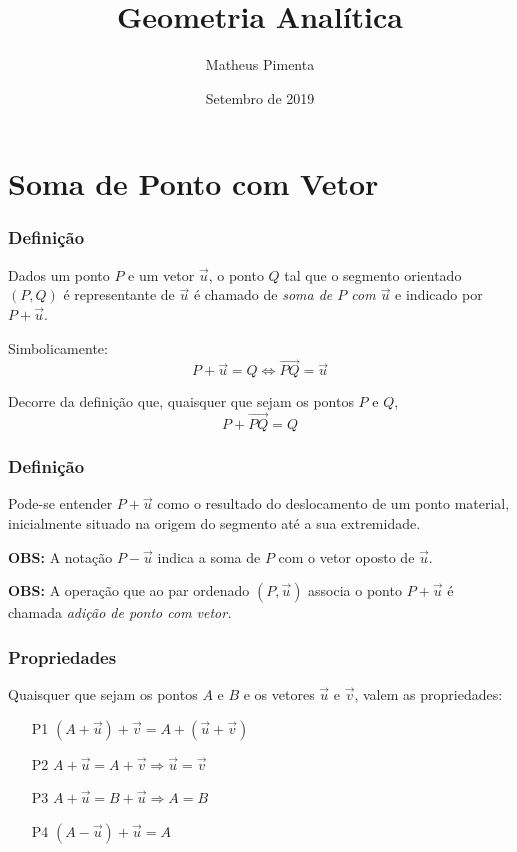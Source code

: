 \documentclass[hyperref={pdfpagelabels=false}]{beamer}
\title{Geometria Analítica}
\author[Matheus Pimenta]{Matheus Pimenta}
\institute[UTFPR-CP]{\normalsize Universidade Tecnológica Federal do Paraná \\
	Câmpus Cornélio Procópio
}
\date{Setembro de 2019}
\begin{document}
	
\begin{frame}
\titlepage
\end{frame} 




\section{Soma de Ponto com Vetor} 


\begin{frame}
\frametitle{Definição} 
Dados um ponto $P$ e um vetor $\overrightarrow{u}$, o ponto $Q$ tal que o segmento orientado $(P,Q)$ é representante de $\overrightarrow{u}$ é chamado de \emph{soma de $P$ com $\overrightarrow{u}$} e indicado por $P + \overrightarrow{u}$. 

Simbolicamente: $$P + \overrightarrow{u} = Q \Leftrightarrow \overrightarrow{PQ} = \overrightarrow{u}$$

Decorre da definição que, quaisquer que sejam os pontos $P$ e $Q$, $$P + \overrightarrow{PQ} = Q$$
\end{frame}

\begin{frame}
\frametitle{Definição}
Pode-se entender $P + \overrightarrow{u}$ como o resultado do deslocamento de um ponto material, inicialmente situado na origem do segmento até a sua extremidade.

{\bf OBS: } A notação $P - \overrightarrow{u}$ indica a soma de $P$ com o vetor oposto de $\overrightarrow{u}$.

{\bf OBS: } A operação que ao par ordenado $(P,\overrightarrow{u})$ associa o ponto $P + \overrightarrow{u}$ é chamada \emph{adição de ponto com vetor.} 

\end{frame}

\begin{frame}
\frametitle{Propriedades}
Quaisquer que sejam os pontos $A$ e $B$ e os vetores $\overrightarrow{u}$ e $\overrightarrow{v}$, valem as propriedades:
\begin{enumerate}
	\item [P1] $(A + \overrightarrow{u}) + \overrightarrow{v} = A + (\overrightarrow{u} + \overrightarrow{v})$
	\pause
	\item [P2] $A + \overrightarrow{u} = A + \overrightarrow{v} \Rightarrow \overrightarrow{u} = \overrightarrow{v} $
	\pause
	\item [P3] $A + \overrightarrow{u} = B + \overrightarrow{u} \Rightarrow A = B $
	\pause
	\item [P4] $(A - \overrightarrow{u}) + \overrightarrow{u} = A$
\end{enumerate}
\end{frame}
\end{document}
